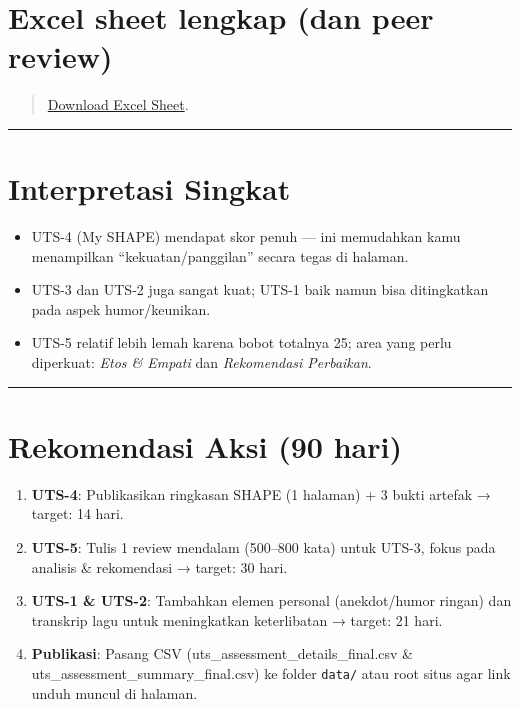 \documentclass[
  letterpaper,
  DIV=11,
  numbers=noendperiod]{scrreprt}
\providecommand{\tightlist}{%
  \setlength{\itemsep}{0pt}\setlength{\parskip}{0pt}}
\begin{document}
\section{Excel sheet lengkap (dan peer
review)}\label{excel-sheet-lengkap-dan-peer-review}

\begin{quote}
\href{./Penilaian.xlsx}{Download Excel Sheet}.
\end{quote}

\begin{center}\rule{0.5\linewidth}{0.5pt}\end{center}

\section{Interpretasi Singkat}\label{interpretasi-singkat}

\begin{itemize}
\tightlist
\item
  UTS-4 (My SHAPE) mendapat skor penuh --- ini memudahkan kamu
  menampilkan ``kekuatan/panggilan'' secara tegas di halaman.\\
\item
  UTS-3 dan UTS-2 juga sangat kuat; UTS-1 baik namun bisa ditingkatkan
  pada aspek humor/keunikan.\\
\item
  UTS-5 relatif lebih lemah karena bobot totalnya 25; area yang perlu
  diperkuat: \emph{Etos \& Empati} dan \emph{Rekomendasi Perbaikan}.
\end{itemize}

\begin{center}\rule{0.5\linewidth}{0.5pt}\end{center}

\section{Rekomendasi Aksi (90 hari)}\label{rekomendasi-aksi-90-hari}

\begin{enumerate}
\def\labelenumi{\arabic{enumi}.}
\tightlist
\item
  \textbf{UTS-4}: Publikasikan ringkasan SHAPE (1 halaman) + 3 bukti
  artefak → target: 14 hari.\\
\item
  \textbf{UTS-5}: Tulis 1 review mendalam (500--800 kata) untuk UTS-3,
  fokus pada analisis \& rekomendasi → target: 30 hari.\\
\item
  \textbf{UTS-1 \& UTS-2}: Tambahkan elemen personal (anekdot/humor
  ringan) dan transkrip lagu untuk meningkatkan keterlibatan → target:
  21 hari.\\
\item
  \textbf{Publikasi}: Pasang CSV (uts\_assessment\_details\_final.csv \&
  uts\_assessment\_summary\_final.csv) ke folder \texttt{data/} atau
  root situs agar link unduh muncul di halaman.
\end{enumerate}
\end{document}
